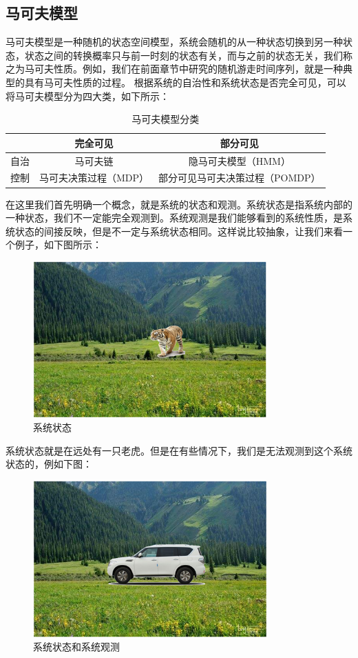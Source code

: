 \subsection{马可夫模型}
马可夫模型是一种随机的状态空间模型，系统会随机的从一种状态切换到另一种状态，状态之间的转换概率只与前一时刻的状态有关，而与之前的状态无关，我们称之为马可夫性质。例如，我们在前面章节中研究的随机游走时间序列，就是一种典型的具有马可夫性质的过程。\newline
根据系统的自治性和系统状态是否完全可见，可以将马可夫模型分为四大类，如下所示：
\begin{table}[H]
\caption{马可夫模型分类}
\label{t000003}
\begin{tabular}{|c|c|c|} \hline
 & 完全可见 & 部分可见 \\ \hline  
自治 & 马可夫链 & 隐马可夫模型（HMM） \\ \hline
控制 & 马可夫决策过程（MDP） & 部分可见马可夫决策过程（POMDP） \\ \hline
\end{tabular}
\end{table}
在这里我们首先明确一个概念，就是系统的状态和观测。系统状态是指系统内部的一种状态，我们不一定能完全观测到。系统观测是我们能够看到的系统性质，是系统状态的间接反映，但是不一定与系统状态相同。这样说比较抽象，让我们来看一个例子，如下图所示：
\begin{figure}[H]
	\caption{系统状态}
	\label{f000066}
	\centering
	\includegraphics[height=6cm]{images/f000066}
\end{figure}
系统状态就是在远处有一只老虎。但是在有些情况下，我们是无法观测到这个系统状态的，例如下图：
\begin{figure}[H]
	\caption{系统状态和系统观测}
	\label{f000067}
	\centering
	\includegraphics[height=6cm]{images/f000067}
\end{figure}
